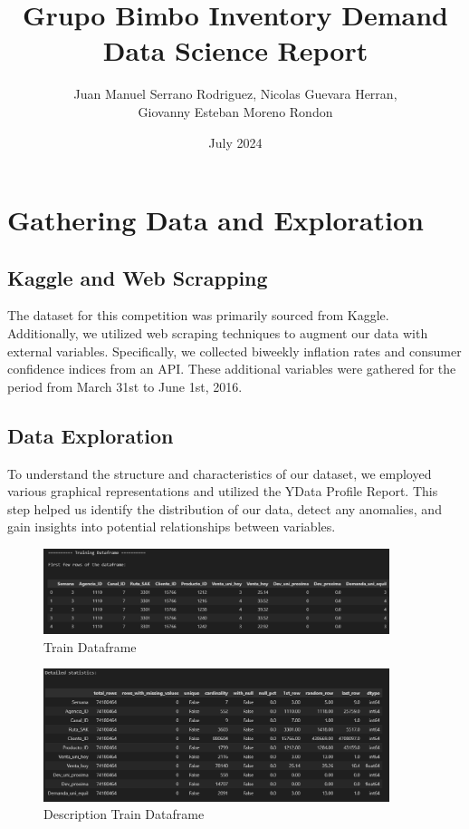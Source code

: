 \documentclass{article}
\title{Grupo Bimbo Inventory Demand \\Data Science Report }
\author{Juan Manuel Serrano Rodriguez, Nicolas Guevara Herran,\\ Giovanny Esteban Moreno Rondon}
\date{July 2024}
\begin{document}
\maketitle

\section{Gathering Data and Exploration}
\subsection{Kaggle and Web Scrapping}
The dataset for this competition was primarily sourced from Kaggle. Additionally, we utilized web scraping techniques to augment our data with external variables. Specifically, we collected biweekly inflation rates and consumer confidence indices from an API. These additional variables were gathered for the period from March 31st to June 1st, 2016.

\subsection{Data Exploration}
To understand the structure and characteristics of our dataset, we employed various graphical representations and utilized the YData Profile Report. This step helped us identify the distribution of our data, detect any anomalies, and gain insights into potential relationships between variables.

\begin{figure}[H]
\begin{center}
\centering
\includegraphics[width=0.9\textwidth]{images/train_df.png}
\caption{Train Dataframe}
\end{center}
\end{figure}

\begin{figure}[H] 
\begin{center}
\centering
\includegraphics[width=0.9\textwidth]{images/descrip_train.png}
\caption{Description Train Dataframe}
\end{center}
\end{figure}
\end{document}
